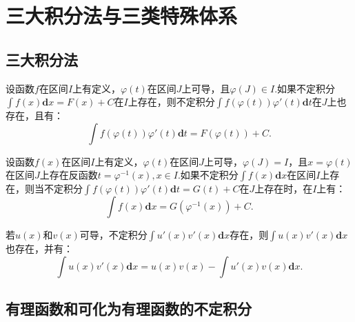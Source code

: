 \section{三大积分法与三类特殊体系}

\subsection{三大积分法}

\begin{theorem}
	设函数$f$在区间$I$上有定义，$\varphi(t)$在区间$J$上可导，且$\varphi(J)\in I$.如果不定积分$\int f(x)\textbf{d}x = F(x)+C$在$I$上存在，则不定积分$\int f(\varphi(t))\varphi'(t)\textbf{d}t$在$J$上也存在，且有：
	\begin{equation}
		\int f(\varphi(t))\varphi'(t)\textbf{d}t = F(\varphi(t))+C.
	\end{equation}
\end{theorem}

\begin{theorem}
	设函数$f(x)$在区间$I$上有定义，$\varphi(t)$在区间$J$上可导，$\varphi(J)=I$，且$x=\varphi(t)$在区间$J$上存在反函数$t = \varphi^{-1}(x),x\in I$.如果不定积分$\int f(x)\textbf{d}x$在区间$I$上存在，则当不定积分$\int f(\varphi(t))\varphi'(t)\textbf{d}t=G(t)+C$在$J$上存在时，在$I$上有：
	\begin{equation}
		\int f(x)\textbf{d}x = G(\varphi^{-1}(x))+C.
	\end{equation}
\end{theorem}

\begin{theorem}[分部积分法]
	若$u(x)$和$v(x)$可导，不定积分$\int u'(x)v'(x)\textbf{d}x$存在，则$\int u(x)v'(x)\textbf{d}x$也存在，并有：
	\begin{equation}
		\int u(x)v'(x)\textbf{d}x = u(x)v(x)-\int u'(x)v(x)\textbf{d}x.
	\end{equation}
\end{theorem}

\subsection{有理函数和可化为有理函数的不定积分}

